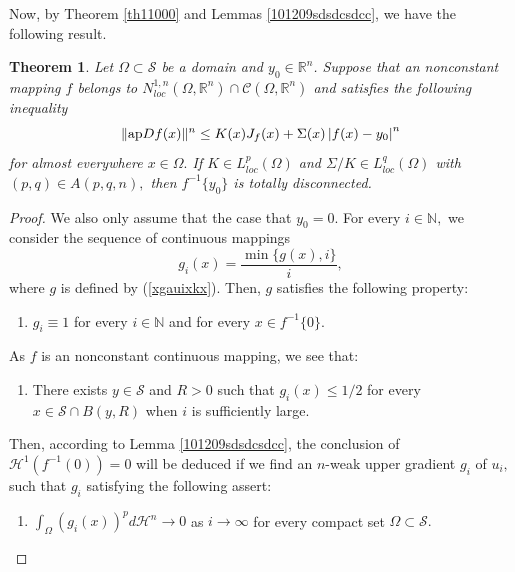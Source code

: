\documentclass[11pt,twoside]{article}
\newtheorem{thm}{Theorem}[section]
\theoremstyle{definition}
\theoremstyle{remark}
\newcommand{\abs}[1]{\left|#1\right|}
\begin{document}
Now, by Theorem \ref{th11000} and Lemmas \ref{101209sdsdcsdcc}, we have the following result.
\begin{thm}\label{101209sdc}
Let  $\Omega\subset\mathcal{S}$ be a domain and $y_{0}\in\mathbb{R}^{n}$. Suppose that an nonconstant mapping $f$ belongs to  $N_{loc}^{1,n}(\Omega,\mathbb{R}^{n})\cap \mathcal{C}(\Omega,\mathbb{R}^{n})$ and satisfies the following inequality
\begin{equation}
\| {\rm ap}Df(x)\|^{n}\leq K(x)J_{f}(x)+\Sigma(x)\abs{f(x)-y_{0}}^{n}
\end{equation}
for almost everywhere $x\in\Omega.$ If $K\in L_{loc}^{p}(\Omega)$ and $\Sigma/K\in L_{loc}^{q}(\Omega)$ with $(p,q)\in A(p,q,n),$  then $f^{-1}\{y_{0}\}$ is totally disconnected.
\end{thm}
\begin{proof}
We also only assume that the case that $y_{0}=0$. For every $i\in\mathbb{N},$ we consider the sequence of continuous mappings $$g_{i}(x)=\frac{\min\{g(x),i\}}{i},$$ 
where $g$ is defined by (\ref{xgauixkx}). Then, $g$ satisfies the following property: 
\begin{enumerate}
\item[{\rm(1)}] $g_{i}\equiv1$ for every $i\in\mathbb{N}$ and for every $x\in f^{-1}\{0\}.$
\end{enumerate} 
As $f$ is an nonconstant continuous mapping, we see that:  
\begin{enumerate}
\item[{\rm(2)}] There exists $y\in\mathcal{S}$ and $R>0$ such that $g_{i}(x)\leq1/2$ for every $x\in\mathcal{S}\cap B(y,R)$ when $i$ is sufficiently large. 
\end{enumerate} 
Then, according to Lemma \ref{101209sdsdcsdcc}, the conclusion of $\mathcal{H}^{1}(f^{-1}(0))=0$ will be deduced if we find an $n$-weak upper gradient $g_{i}$ of $u_{i},$ such that $g_{i}$ satisfying the following assert:
\begin{enumerate}
\item[{\rm(3)}] $\int_{\Omega}(g_{i}(x))^{p}d\mathcal{H}^{n}\rightarrow0$ as $i\rightarrow\infty$ for every compact set $\Omega\subset\mathcal{S}.$
\end{enumerate} 


\end{proof}
\end{document}
